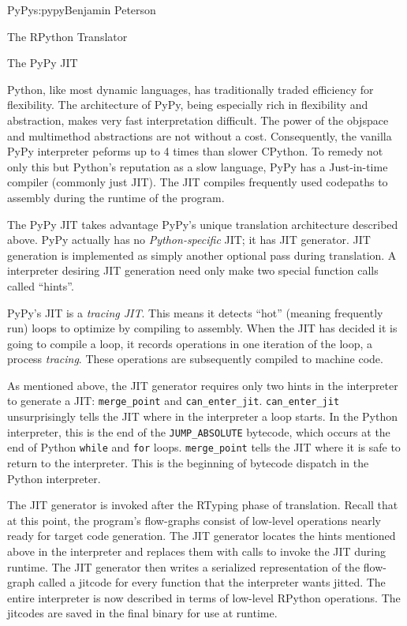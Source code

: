 \begin{aosachapter}{PyPy}{s:pypy}{Benjamin Peterson}
\begin{aosasect1}{The RPython Translator}
\end{aosasect1}

\begin{aosasect1}{The PyPy JIT}

Python, like most dynamic languages, has traditionally traded efficiency for
flexibility. The architecture of PyPy, being especially rich in flexibility and
abstraction, makes very fast interpretation difficult. The power of the objspace
and multimethod abstractions are not without a cost. Consequently, the vanilla
PyPy interpreter peforms up to 4 times than slower CPython. To remedy not only
this but Python's reputation as a slow language, PyPy has a Just-in-time
compiler (commonly just JIT). The JIT compiles frequently used codepaths to
assembly during the runtime of the program.

The PyPy JIT takes advantage PyPy's unique translation architecture described
above. PyPy actually has no \emph{Python-specific} JIT; it has JIT
generator. JIT generation is implemented as simply another optional pass during
translation. A interpreter desiring JIT generation need only make two special
function calls called ``hints''.

PyPy's JIT is a \emph{tracing JIT}. This means it detects ``hot'' (meaning
frequently run) loops to optimize by compiling to assembly. When the JIT has
decided it is going to compile a loop, it records operations in one iteration of
the loop, a process \emph{tracing}. These operations are subsequently compiled
to machine code.

As mentioned above, the JIT generator requires only two hints in the interpreter
to generate a JIT: \verb+merge_point+ and
\verb+can_enter_jit+. \verb+can_enter_jit+ unsurprisingly tells the JIT where in
the interpreter a loop starts. In the Python interpreter, this is the end of the
\verb+JUMP_ABSOLUTE+ bytecode, which occurs at the end of Python \verb+while+
and \verb+for+ loops. \verb+merge_point+ tells the JIT where it is safe to
return to the interpreter. This is the beginning of bytecode dispatch in the
Python interpreter.

The JIT generator is invoked after the RTyping phase of translation. Recall that
at this point, the program's flow-graphs consist of low-level operations nearly
ready for target code generation. The JIT generator locates the hints mentioned
above in the interpreter and replaces them with calls to invoke the JIT during
runtime. The JIT generator then writes a serialized representation of the
flow-graph called a jitcode for every function that the interpreter wants
jitted. The entire interpreter is now described in terms of low-level RPython
operations. The jitcodes are saved in the final binary for use at runtime.


\end{aosasect1}
\end{aosachapter}
